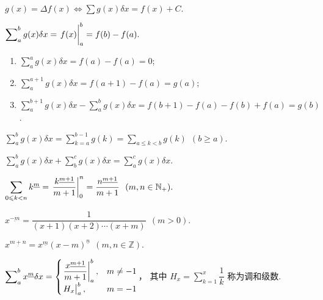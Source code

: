 \begin{definition}[不定和]
    $\displaystyle g(x)=\varDelta f(x)\iff \sum g(x)\delta x=f(x)+C.$
\end{definition}

\begin{definition}[定和]
    $\displaystyle \sum\nolimits_{a}^{b} g(x)\delta x=\eval{f(x)}_{a}^{b}=f(b)-f(a).$
\end{definition}

\begin{enumerate}[label=(\arabic{*})]
    \item $\displaystyle \sum\nolimits_a^a g(x)\delta x=f(a)-f(a)=0$;
    \item $\displaystyle \sum\nolimits_a^{a+1} g(x)\delta x=f(a+1)-f(a)=g(a)$;
    \item $\displaystyle \sum\nolimits_{a}^{b+1}g(x)\delta x-\sum\nolimits_{a}^{b}g(x)\delta x=f(b+1)-f(a)-f(b)+f(a)=g(b)$.
\end{enumerate}

\begin{theorem}
    $\displaystyle \sum\nolimits_{a}^{b}g(x)\delta x=\sum_{k=a}^{b-1}g(k)=\sum_{a\leqslant k<b}g(k)~~(b\geqslant a).$
\end{theorem}

\begin{theorem}
    $\displaystyle \sum\nolimits_{a}^{b}g(x)\delta x+\sum\nolimits_b^c g(x)\delta x=\sum\nolimits_a^cg(x)\delta x.$
\end{theorem}

\begin{theorem}
    $\displaystyle \sum_{0\leqslant k<n}k^{\underline{m}}=\eval{\dfrac{k^{\underline{m+1}}}{m+1}}_{0}^{n}=\dfrac{n^{\underline{m+1}}}{m+1}~~(m,n\in\mathbb{N}_+).$
\end{theorem}

\begin{definition}
    $x^{\underline{-m}}=\dfrac{1}{(x+1)(x+2)\cdots(x+m)}~~(m>0).$
\end{definition}

\begin{theorem}
    $x^{\underline{m+n}}=x^{\underline{m}}(x-m)^{\underline{n}} ~~(m,n\in\mathbb{Z}).$
\end{theorem}

\begin{theorem}
    $\displaystyle\sum\nolimits_a^b x^{\underline{m}}\delta x=\begin{cases}
            \eval{\dfrac{x^{\underline{m+1}}}{m+1}}_{a}^{b}, & m\neq -1 \\
            \eval{H_x}_{a}^{b},                              & m=-1
        \end{cases}$，
    其中 $\displaystyle H_x=\sum_{k=1}^{x}\dfrac{1}{k}$ 称为调和级数.
\end{theorem}

